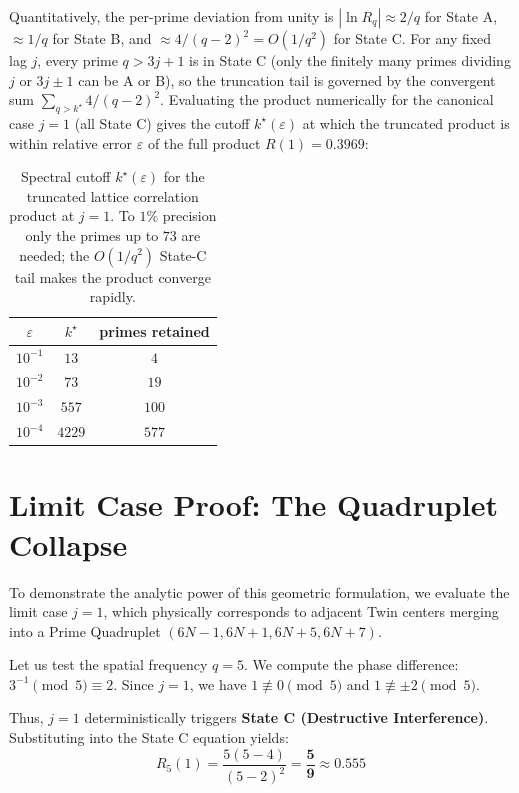 \documentclass[11pt,a4paper]{article}
\begin{document}
Quantitatively, the per-prime deviation from unity is $|\ln R_q|\approx 2/q$ for State A, $\approx 1/q$ for State B, and $\approx 4/(q-2)^2=O(1/q^2)$ for State C. For any fixed lag $j$, every prime $q>3j+1$ is in State C (only the finitely many primes dividing $j$ or $3j\pm1$ can be A or B), so the truncation tail is governed by the convergent sum $\sum_{q>k^\star}4/(q-2)^2$. Evaluating the product numerically for the canonical case $j=1$ (all State C) gives the cutoff $k^\star(\varepsilon)$ at which the truncated product is within relative error $\varepsilon$ of the full product $R(1)=0.3969$:

\begin{table}[h]\centering
\begin{tabular}{ccc}
\hline
$\varepsilon$ & $k^\star$ & primes retained\\
\hline
$10^{-1}$ & $13$ & $4$\\
$10^{-2}$ & $73$ & $19$\\
$10^{-3}$ & $557$ & $100$\\
$10^{-4}$ & $4229$ & $577$\\
\hline
\end{tabular}
\caption{Spectral cutoff $k^\star(\varepsilon)$ for the truncated lattice
correlation product at $j=1$. To $1\%$ precision only the primes up to $73$ are
needed; the $O(1/q^2)$ State-C tail makes the product converge rapidly.}
\label{tab:kstar}
\end{table}

\section{Limit Case Proof: The Quadruplet Collapse}

To demonstrate the analytic power of this geometric formulation, we evaluate the limit case $j=1$, which physically corresponds to adjacent Twin centers merging into a Prime Quadruplet $(6N-1, 6N+1, 6N+5, 6N+7)$.

Let us test the spatial frequency $q=5$. We compute the phase difference:
$3^{-1} \pmod 5 \equiv 2$.
Since $j=1$, we have $1 \not\equiv 0 \pmod 5$ and $1 \not\equiv \pm 2 \pmod 5$. 

Thus, $j=1$ deterministically triggers \textbf{State C (Destructive Interference)}. Substituting into the State C equation yields:
\begin{equation}
R_5(1) = \frac{5(5-4)}{(5-2)^2} = \mathbf{\frac{5}{9}} \approx 0.555
\end{equation}
\end{document}
